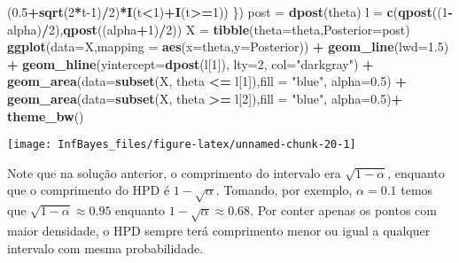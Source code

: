 \documentclass[
]{book}
\newenvironment{Shaded}{\begin{snugshade}}{\end{snugshade}}
\newcommand{\DataTypeTok}[1]{\textcolor[rgb]{0.13,0.29,0.53}{#1}}
\newcommand{\DecValTok}[1]{\textcolor[rgb]{0.00,0.00,0.81}{#1}}
\newcommand{\FloatTok}[1]{\textcolor[rgb]{0.00,0.00,0.81}{#1}}
\newcommand{\KeywordTok}[1]{\textcolor[rgb]{0.13,0.29,0.53}{\textbf{#1}}}
\newcommand{\NormalTok}[1]{#1}
\newcommand{\OperatorTok}[1]{\textcolor[rgb]{0.81,0.36,0.00}{\textbf{#1}}}
\newcommand{\StringTok}[1]{\textcolor[rgb]{0.31,0.60,0.02}{#1}}
\begin{document}
\begin{Shaded}
\begin{Highlighting}[]
\NormalTok{    (}\FloatTok{0.5}\OperatorTok{+}\KeywordTok{sqrt}\NormalTok{(}\DecValTok{2}\OperatorTok{*}\NormalTok{t}\DecValTok{-1}\NormalTok{)}\OperatorTok{/}\DecValTok{2}\NormalTok{)}\OperatorTok{*}\KeywordTok{I}\NormalTok{(t}\OperatorTok{<}\DecValTok{1}\NormalTok{)}\OperatorTok{+}\KeywordTok{I}\NormalTok{(t}\OperatorTok{>=}\DecValTok{1}\NormalTok{)) \})}
\NormalTok{post =}\StringTok{ }\KeywordTok{dpost}\NormalTok{(theta)}
\NormalTok{l =}\StringTok{ }\KeywordTok{c}\NormalTok{(}\KeywordTok{qpost}\NormalTok{((}\DecValTok{1}\OperatorTok{-}\NormalTok{alpha)}\OperatorTok{/}\DecValTok{2}\NormalTok{),}\KeywordTok{qpost}\NormalTok{((alpha}\OperatorTok{+}\DecValTok{1}\NormalTok{)}\OperatorTok{/}\DecValTok{2}\NormalTok{))}
\NormalTok{X =}\StringTok{ }\KeywordTok{tibble}\NormalTok{(}\DataTypeTok{theta=}\NormalTok{theta,}\DataTypeTok{Posterior=}\NormalTok{post)}
\KeywordTok{ggplot}\NormalTok{(}\DataTypeTok{data=}\NormalTok{X,}\DataTypeTok{mapping =} \KeywordTok{aes}\NormalTok{(}\DataTypeTok{x=}\NormalTok{theta,}\DataTypeTok{y=}\NormalTok{Posterior)) }\OperatorTok{+}
\StringTok{  }\KeywordTok{geom_line}\NormalTok{(}\DataTypeTok{lwd=}\FloatTok{1.5}\NormalTok{) }\OperatorTok{+}
\StringTok{  }\KeywordTok{geom_hline}\NormalTok{(}\DataTypeTok{yintercept=}\KeywordTok{dpost}\NormalTok{(l[}\DecValTok{1}\NormalTok{]), }\DataTypeTok{lty=}\DecValTok{2}\NormalTok{, }\DataTypeTok{col=}\StringTok{"darkgray"}\NormalTok{) }\OperatorTok{+}
\StringTok{  }\KeywordTok{geom_area}\NormalTok{(}\DataTypeTok{data=}\KeywordTok{subset}\NormalTok{(X, theta }\OperatorTok{<=}\StringTok{ }\NormalTok{l[}\DecValTok{1}\NormalTok{]),}\DataTypeTok{fill =} \StringTok{"blue"}\NormalTok{, }\DataTypeTok{alpha=}\FloatTok{0.5}\NormalTok{) }\OperatorTok{+}
\StringTok{  }\KeywordTok{geom_area}\NormalTok{(}\DataTypeTok{data=}\KeywordTok{subset}\NormalTok{(X, theta }\OperatorTok{>=}\StringTok{ }\NormalTok{l[}\DecValTok{2}\NormalTok{]),}\DataTypeTok{fill =} \StringTok{"blue"}\NormalTok{, }\DataTypeTok{alpha=}\FloatTok{0.5}\NormalTok{)}\OperatorTok{+}
\StringTok{  }\KeywordTok{theme_bw}\NormalTok{()}
\end{Highlighting}
\end{Shaded}

\begin{center}\texttt{[image: InfBayes\_files/figure-latex/unnamed-chunk-20-1]} \end{center}

Note que na solução anterior, o comprimento do intervalo era \(\sqrt{1-\alpha}\), enquanto que o comprimento do HPD é \(1-\sqrt{\alpha}\). Tomando, por exemplo, \(\alpha=0.1\) temos que \(\sqrt{1-\alpha} \approx 0.95\) enquanto \(1-\sqrt{\alpha}\approx 0.68\). Por conter apenas os pontos com maior densidade, o HPD sempre terá comprimento menor ou igual a qualquer intervalo com mesma probabilidade.
\end{document}
